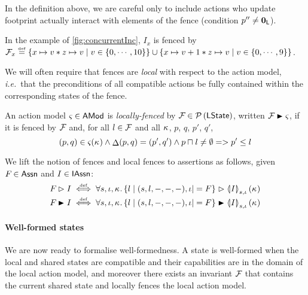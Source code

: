 In the definition above, we are careful only to include actions who
update footprint actually interact with elements of the fence
(condition $p'' \neq \mathbf{0}_{\textsf{L}}$).

In the example of \fig\ref{fig:concurrentInc}, $I_x$ is fenced by
$\mathcal{F}_{x} \mathrel{\stackrel{\smash{\scriptscriptstyle{\mathrm{def}}}}{=}} \left\{x \mapsto v * z \mapsto v \mid v \in \{0,
\cdots, 10\} \right\} \cup \left\{x \mapsto v+1 * z \mapsto v \mid v
\in \{0 ,\cdots, 9 \}\right\}$.

We will often require that fences are \emph{local} with respect to the
action model, \textit{i.e.}\ that the preconditions of all compatible
actions be fully contained within the corresponding states of the
fence.


\begin{definition}
  An action model $\varsigma_{} \in \textsf{AMod}$ is \emph{locally-fenced} by
  $\mathcal{F}_{} \in \mathcal{P}\left(\textsf{LState} \right)$, written $\fence{} \strictfences
  \amod{}$, if it is fenced by $\mathcal{F}_{}$ and, for all $l\in\mathcal{F}_{}$
  and all $\kappa_{}$, $p$, $q$, $p'$, $q'$,
  \[
  (p, q) \in \varsigma_{}(\kappa_{}) \land 
  \mathop{\Delta}(p, q) = (p', q') \land 
  p \sqcap_{} l \neq \emptyset
  =>
  p' \leq l
  \]
\end{definition}


We lift the notion of fences and local fences to
assertions as follows, given $F_{} \in \textsf{Assn}$ and $I \in
\textsf{IAssn}$:
\begin{align*}
  \fenceAss{} \fences I &\iffdef \for{s,\lenv,\ca{}}
  \{ l \mid (s,l, -, -, -), \lenv |= F \} \fences \semI[s,\lenv]{I}(\ca{})\\
  \fenceAss{} \strictfences I &\iffdef \for{s,\lenv,\ca{}}
  \{ l \mid (s,l, -, -, -), \lenv |= F \} \strictfences \semI[s,\lenv]{I}(\ca{})
\end{align*}





\paragraph{Well-formed states}
We are now ready to formalise well-formedness.  A state is well-formed
when the local and shared states are compatible and their capabilities
are in the domain of the local action model, and moreover there exists
an invariant $\mathcal{F}_{}$ that contains the current shared state and
locally fences the local action model.

